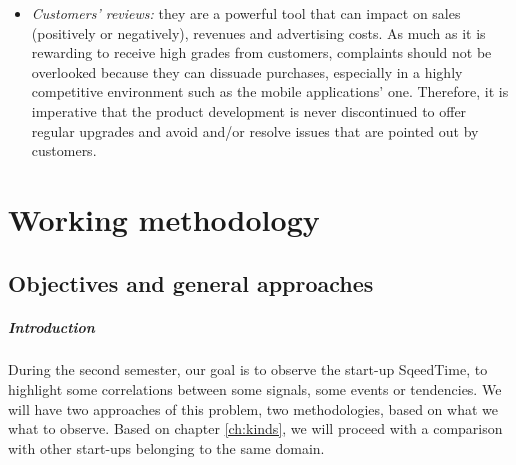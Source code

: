 \documentclass[twoside]{report}
\begin{document}
\begin{itemize}
		\item \emph{Customers' reviews:} they are a powerful tool that can impact on sales (positively or negatively), revenues and advertising costs. As much as it is rewarding to receive high grades from customers, complaints should not be overlooked because they can dissuade purchases, especially in a highly competitive environment such as the mobile applications’ one. Therefore, it is imperative that the product development is never discontinued to offer regular upgrades and avoid and/or resolve issues that are pointed out by customers.
	\end{itemize}

	\chapter{Working methodology}
	\label{ch:method}
	\section{Objectives and general approaches}
	\paragraph{Introduction }During the second semester, our goal is to observe the start-up SqeedTime, to highlight some correlations between some signals, some events or tendencies. We will have two approaches of this problem, two methodologies, based on what we what to observe. Based on chapter \ref{ch:kinds}, we will proceed with a comparison with other start-ups belonging to the same domain.
\end{document}
